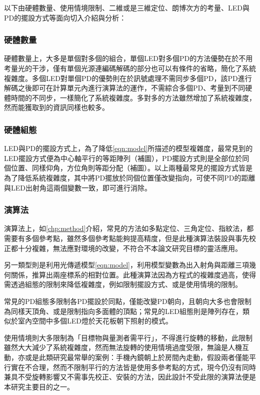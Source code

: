         以下由硬體數量、使用情境限制、二維或是三維定位、朗博次方的考量、LED與PD的擺設方式等面向切入介紹與分析：

        \subsubsection{硬體數量}
        硬體數量上，大多是單個對多個的組合，單個LED對多個PD的方法\cite{case:cart2d}\cite{case:cart3d}\cite{case:3d_layers}優勢在於不用考量光的干涉，僅有單個光源連編碼解碼的部分也可以有條件的省略，簡化了系統複雜度。多個LED對單個PD的優勢則在於訊號處理不需同步多個PD，該PD進行解碼之後即可在計算單元內進行演算法的運作，不需綜合多個PD、考量到不同硬體時間的不同步，一樣簡化了系統複雜度。多對多的方法\cite{case:ml}雖然增加了系統複雜度，然而能獲取到的資訊同樣也較多。

        \subsubsection{硬體組態}   
        LED與PD的擺設方式上，為了降低\ref{eqn:model}所描述的模型複雜度，最常見到的LED擺設方式便為中心軸平行的等距陣列（補圖），PD擺設方式則是全部位於同個位置、同樣仰角，方位角則等距分配（補圖）\cite{case:cart2d}\cite{case:cart3d}\cite{case:3d_layers}。以上兩種最常見的擺設方式皆是為了降低系統複雜度，其中將PD擺放於同個位置僅改變指向，可使不同PD的距離與LED出射角這兩個變數一致，即可進行消除。
        
        \subsubsection{演算法}
        演算法上，如\ref{chp:method}介紹，常見的方法如多點定位、三角定位、指紋法，都需要有多個參考點，雖然多個參考點能夠提高精度，但是此種演算法裝設與事先校正都十分複雜，無法應對環境的改變，不符合不本論文研究目標的靈活應用。
        
        另一類型則是利用光傳遞模型\ref{eqn:model}，利用模型變數為出入射角與距離三項幾何關係，推算出兩座標系的相對位置。此種演算法因為方程式的複雜度過高，使得需透過組態的限制來降低複雜度，例如限制擺設方式、或是使用情境的限制。

        常見的PD組態多限制各PD擺設於同點，僅能改變PD朝向，且朝向大多也會限制為同樣天頂角、或是限制指向多面體的頂點；常見的LED組態則是陣列存在，類似於室內空間中多個LED燈於天花板朝下照射的模式。

        使用情境則大多限制為「目標物與量測者需平行」，不得進行旋轉的移動，此限制雖然大大減少了系統複雜度，然而無法旋轉的使用情境過度受限，無論是人機互動，亦或是此類研究最常舉的案例：手機內鏡朝上於房間內走動，假設兩者僅能平行實在不合理，然而不限制平行的方法皆是使用多參考點的方式，現今仍沒有同時兼具不受旋轉影響又不需事先校正、安裝的方法，因此設計不受此限的演算法便是本研究主要目的之一。

